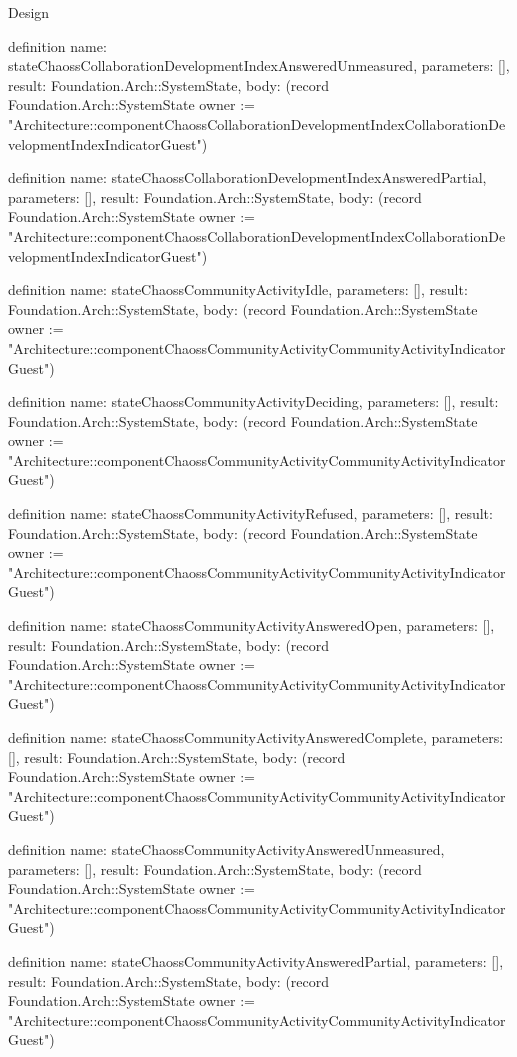 \begin{lexlean}{Design}
\begin{semanticmodule}
definition{
  name: stateChaossCollaborationDevelopmentIndexAnsweredUnmeasured,
  parameters: [],
  result: Foundation.Arch::SystemState,
  body: (record Foundation.Arch::SystemState {owner := "Architecture::componentChaossCollaborationDevelopmentIndexCollaborationDevelopmentIndexIndicatorGuest"})
}

definition{
  name: stateChaossCollaborationDevelopmentIndexAnsweredPartial,
  parameters: [],
  result: Foundation.Arch::SystemState,
  body: (record Foundation.Arch::SystemState {owner := "Architecture::componentChaossCollaborationDevelopmentIndexCollaborationDevelopmentIndexIndicatorGuest"})
}

definition{
  name: stateChaossCommunityActivityIdle,
  parameters: [],
  result: Foundation.Arch::SystemState,
  body: (record Foundation.Arch::SystemState {owner := "Architecture::componentChaossCommunityActivityCommunityActivityIndicatorGuest"})
}

definition{
  name: stateChaossCommunityActivityDeciding,
  parameters: [],
  result: Foundation.Arch::SystemState,
  body: (record Foundation.Arch::SystemState {owner := "Architecture::componentChaossCommunityActivityCommunityActivityIndicatorGuest"})
}

definition{
  name: stateChaossCommunityActivityRefused,
  parameters: [],
  result: Foundation.Arch::SystemState,
  body: (record Foundation.Arch::SystemState {owner := "Architecture::componentChaossCommunityActivityCommunityActivityIndicatorGuest"})
}

definition{
  name: stateChaossCommunityActivityAnsweredOpen,
  parameters: [],
  result: Foundation.Arch::SystemState,
  body: (record Foundation.Arch::SystemState {owner := "Architecture::componentChaossCommunityActivityCommunityActivityIndicatorGuest"})
}

definition{
  name: stateChaossCommunityActivityAnsweredComplete,
  parameters: [],
  result: Foundation.Arch::SystemState,
  body: (record Foundation.Arch::SystemState {owner := "Architecture::componentChaossCommunityActivityCommunityActivityIndicatorGuest"})
}

definition{
  name: stateChaossCommunityActivityAnsweredUnmeasured,
  parameters: [],
  result: Foundation.Arch::SystemState,
  body: (record Foundation.Arch::SystemState {owner := "Architecture::componentChaossCommunityActivityCommunityActivityIndicatorGuest"})
}

definition{
  name: stateChaossCommunityActivityAnsweredPartial,
  parameters: [],
  result: Foundation.Arch::SystemState,
  body: (record Foundation.Arch::SystemState {owner := "Architecture::componentChaossCommunityActivityCommunityActivityIndicatorGuest"})
}


\end{semanticmodule}
\end{lexlean}
